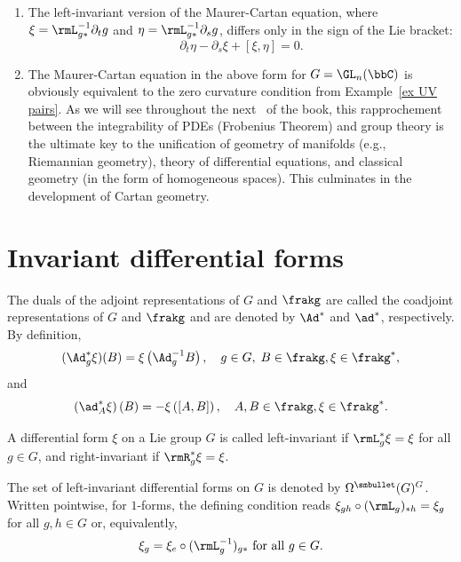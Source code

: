 \begin{rem}
    \begin{enumerate}
        \item The left-invariant version of the Maurer-Cartan equation, where $\xi=\rmL_{g\ast}^{-1}\partial_t g$ and $\eta =\rmL_{g\ast}^{-1}\partial_s g$, differs only in the sign of the Lie bracket: 
        \[\partial_t\eta-\partial_s\xi+[\xi,\eta]=0.\label{eq Maurer-Cartan left xi eta}\]
        \item The Maurer-Cartan equation in the above form for $G=\GL_n(\bbC)$ is obviously equivalent to the zero curvature condition from Example~\ref{ex UV pairs}. As we will see throughout the next \partt\ of the book, this rapprochement between the integrability of PDEs (Frobenius Theorem) and group theory is the ultimate key to the unification of geometry of manifolds (e.g., Riemannian geometry), theory of differential equations, and classical geometry (in the form of homogeneous spaces). This culminates in the development of Cartan geometry.
    \end{enumerate}
\end{rem}










\section{Invariant differential forms}\label{subsec: invariant diff forms}

\begin{defn}
    The duals of the adjoint representations of $G$ and $\frakg$ are called the coadjoint representations of $G$ and $\frakg$ and are denoted by $\Ad^\ast$ and $\ad^\ast$, respectively. By definition,
    \[(\Ad^\ast_g \xi)(B)=\xi\left(\Ad_g^{-1}B\right),\quad  g\in G,\;B\in\frakg,\xi\in\frakg^\ast,\]
    and 
    \[\left(\ad_A^\ast \xi\right)(B)=-\xi\left([A,B]\right),\quad A,B\in\frakg,\xi\in\frakg^\ast.\]
\end{defn}


\begin{defn}
    A differential form $\xi$ on a Lie group $G$ is called left-invariant if $\rmL_g^\ast\xi =\xi $ for all $g\in G$, and right-invariant if $\rmR_g^\ast\xi=\xi$.

    The set of left-invariant differential forms on $G$ is denoted by $\Omega^{\smbullet }(G)^G$. Written pointwise, for $1$-forms, the defining condition reads $\xi_{gh}\circ (\rmL_g)_{\ast h}=\xi_g$ for all $g,h\in G$ or, equivalently,
    \[\xi_g=\xi_e\circ (\rmL_{g}^{-1})_{g\ast}\text{ for all }g\in G.\label{eq 5.5.1 RS1}\]
\end{defn}

